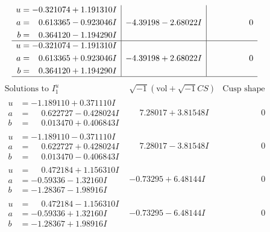\documentclass[1p]{elsarticle_modified}
\theoremstyle{definition}
\newcommand{\I}{\sqrt{-1}}
\begin{document}
$$\begin{array}{c|c|c}
\begin{aligned}
u &= -0.321074 + 1.191310 I \\
a &= \phantom{-}0.613365 - 0.923046 I \\
b &= \phantom{-}0.364120 - 1.194290 I\end{aligned}
 & -4.39198 - 2.68022 I & \phantom{-0.000000 } 0 \\ \hline\begin{aligned}
u &= -0.321074 - 1.191310 I \\
a &= \phantom{-}0.613365 + 0.923046 I \\
b &= \phantom{-}0.364120 + 1.194290 I\end{aligned}
 & -4.39198 + 2.68022 I & \phantom{-0.000000 } 0\\
 \hline 
 \end{array}$$\newpage$$\begin{array}{c|c|c}  
\text{Solutions to }I^u_{1}& \I (\text{vol} + \sqrt{-1}CS) & \text{Cusp shape}\\
 \hline 
\begin{aligned}
u &= -1.189110 + 0.371110 I \\
a &= \phantom{-}0.622727 - 0.428024 I \\
b &= \phantom{-}0.013470 + 0.406843 I\end{aligned}
 & \phantom{-}7.28017 + 3.81548 I & \phantom{-0.000000 } 0 \\ \hline\begin{aligned}
u &= -1.189110 - 0.371110 I \\
a &= \phantom{-}0.622727 + 0.428024 I \\
b &= \phantom{-}0.013470 - 0.406843 I\end{aligned}
 & \phantom{-}7.28017 - 3.81548 I & \phantom{-0.000000 } 0 \\ \hline\begin{aligned}
u &= \phantom{-}0.472184 + 1.156310 I \\
a &= -0.59336 - 1.32160 I \\
b &= -1.28367 - 1.98916 I\end{aligned}
 & -0.73295 + 6.48144 I & \phantom{-0.000000 } 0 \\ \hline\begin{aligned}
u &= \phantom{-}0.472184 - 1.156310 I \\
a &= -0.59336 + 1.32160 I \\
b &= -1.28367 + 1.98916 I\end{aligned}
 & -0.73295 - 6.48144 I & \phantom{-0.000000 } 0 \\ \hline\begin{aligned}

\end{aligned}
\end{array}$$
\end{document}
